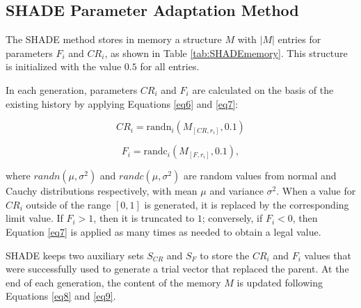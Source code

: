 \documentclass[review]{elsarticle}
\begin{document}
\subsection{SHADE Parameter Adaptation Method}

The SHADE method stores in memory a structure $M$ with $|M|$ entries for parameters $F_i$ and $CR_i$, as shown in Table \ref{tab:SHADEmemory}. This structure is initialized with the value $0.5$ for all entries.

\begin{table}[!h]
	\centering
	\setlength{\tabcolsep}{13pt}
	\caption{Historical memory $M_{CR}$, $M_{F}$ used by SHADE \cite{tanabe2013success}.}
	\label{tab:SHADEmemory}
\end{table}

In each generation, parameters $CR_i$ and $F_i$ are calculated on the basis of the existing history by applying Equations \eqref{eq6} and \eqref{eq7}:

\begin{equation}
CR_i = \text{randn}_i(M_{[CR,r_i]}, 0.1)
\label{eq6}
\end{equation}

\begin{equation}
F_i = \text{randc}_i(M_{[F,r_i]}, 0.1),
\label{eq7}
\end{equation}

\noindent where $randn(\mu, \sigma^2)$ and $randc(\mu, \sigma^2)$ are random values from normal and Cauchy distributions respectively, with mean $\mu$ and variance $\sigma^2$. When a value for $CR_i$ outside of the range $[0,1]$ is generated, it is replaced by the corresponding limit value. If $F_i > 1$, then it is truncated to $1$; conversely, if $F_i < 0$, then Equation \eqref{eq7} is applied as many times as needed to obtain a legal value.

SHADE keeps two auxiliary sets $S_{CR}$ and $S_F$ to store the $CR_i$ and $F_i$ values that were successfully used to generate a trial vector that replaced the parent. At the end of each generation, the content of the memory $M$ is updated following Equations \eqref{eq8} and \eqref{eq9}.
\end{document}
